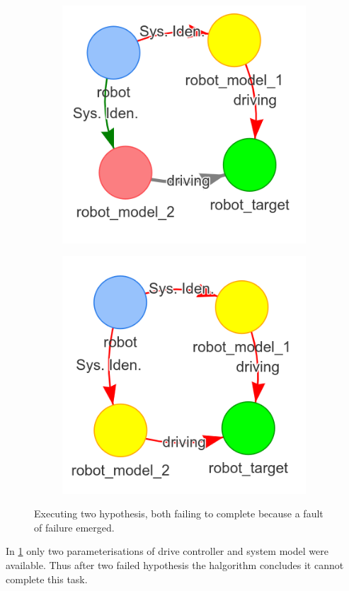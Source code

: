 \begin{figure}[H]
\begin{subfigure}{.3\textwidth}
    \end{subfigure}
    \begin{subfigure}{.3\textwidth}
    \centering
    \includegraphics[width=1\textwidth]{figures/connecting_nodes/failure/fail_6}
    \end{subfigure}

    \begin{subfigure}{.3\textwidth}
    \centering
    \includegraphics[width=1\textwidth]{figures/connecting_nodes/failure/fail_7}
    \end{subfigure}
    \hfill
    \caption{Executing two hypothesis, both failing to complete because a fault of failure emerged.}%
    \label{fig:failure_in_hgraph}
\end{figure}

In \cref{fig:failure_in_hgraph} only two parameterisations of drive controller and system model were available. Thus after two failed hypothesis the \ac{halgorithm} concludes it cannot complete this task.\bs
